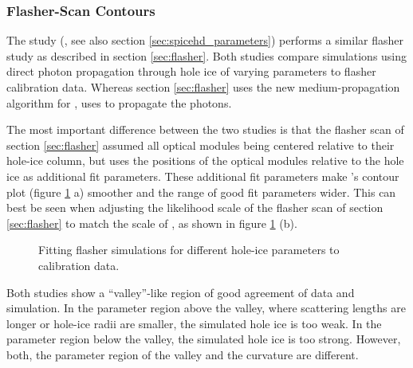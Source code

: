 \subsubsection{ Flasher-Scan Contours}
\label{sec:spicehd_flasher_scan_contours}

The  study
(,
see also section \ref{sec:spicehd_parameters}) performs a similar
flasher study as described in section \ref{sec:flasher}. Both studies
compare simulations using direct photon propagation through hole ice of
varying parameters to flasher calibration data. Whereas section
\ref{sec:flasher} uses the new medium-propagation algorithm for \clsim,
 uses \ppc to propagate the photons.
\cite{martinspicehddard}

The most important difference between the two studies is that the
flasher scan of section \ref{sec:flasher} assumed all optical modules
being centered relative to their hole-ice column, but 
uses the positions of the optical modules relative to the hole ice as
additional fit parameters. These additional fit parameters make
's contour plot (figure \ref{fig:ahCoHee4} a) smoother and
the range of good fit parameters wider. This can best be seen when
adjusting the likelihood scale of the flasher scan of section
\ref{sec:flasher} to match the scale of , as shown in
figure \ref{fig:ahCoHee4} (b).

\begin{figure}[htbp]
  \hfill
  \caption{Fitting flasher simulations for different hole-ice parameters to calibration data.}
  \label{fig:ahCoHee4}
\end{figure}

Both studies show a ``valley''-like region of good agreement of data and
simulation. In the parameter region above the valley, where scattering
lengths are longer or hole-ice radii are smaller, the simulated hole ice
is too weak. In the parameter region below the valley, the simulated
hole ice is too strong. However, both, the parameter region of the
valley and the curvature are different.

